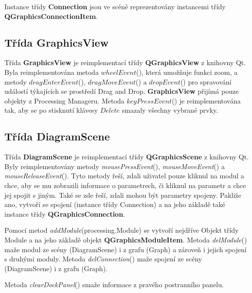 Instance třídy \textbf{Connection} jsou ve scéně reprezentovány
instancemi třídy \textbf{QGraphicsConnectionItem}.

\subsection*{Třída GraphicsView}
Třída \textbf{GraphicsView} je reimplementací
třídy \textbf{QGraphicsView} z knihovny Qt. Byla reimplementována
metoda $wheelEvent$(), která umožňuje funkci zoom, a metody
$dragEnterEvent$(), $dragMoveEvent$() a $dropEvent$() pro spravování
událostí týkajících se prostředí Drag and Drop. \textbf{GraphicsView}
přijímá pouze objekty z Processing Manageru. Metoda $keyPressEvent$()
je reimplementována tak, aby se po stisknutí klávesy $Delete$ smazaly
všechny vybrané prvky.


\subsection*{Třída DiagramScene}
Třída \textbf{DiagramScene} je reimplementací
třídy \textbf{QGraphicsScene} z knihovny Qt. Byly reimplementovány
metody \textit{mousePressEvent}(), \textit{mouseMoveEvent}()
a \textit{mouseReleaseEvent}(). Tyto metody řeší, zdali uživatel pouze
kliknul na modul a chce, aby se mu zobrazili informace o parametrech,
či kliknul na parametr a chce jej spojit s jiným. Také se zde řeší,
zdali mohou být parametry spojeny. Pakliže ano, vytvoří se spojení
(instance třídy Connection) a na jeho základě také instance
třídy \textbf{QGraphicsConnection}.

Pomocí metod \textit{addModule}(processing.Module) se vytvoří nejdříve
Objekt třídy Module a na jeho základě
objekt \textbf{QGraphicsModuleItem}. Metoda \textit{delModule}() maže
modul ze scény (DiagramScene) i z grafu (Graph) a zároveň i jejich
spojení s druhými moduly. Metoda \textit{delConnection}() maže spojení
ze scény (DiagramScene) i z grafu (Graph).

Metoda \textit{clearDockPanel}() smaže informace z pravého postranního
panelu.
